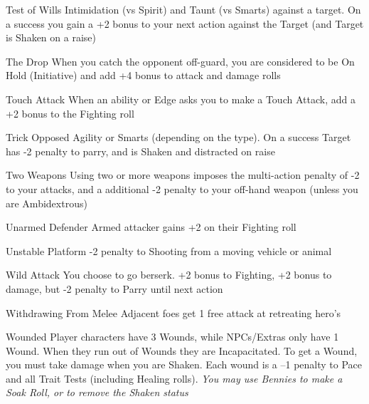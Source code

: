 \begin{genericsection}{Test of Wills}
Intimidation (vs Spirit) and Taunt (vs Smarts) against a target. On a success you gain a +2 bonus to your next action against the Target (and Target is Shaken on a raise)
\end{genericsection}

\begin{genericsection}{The Drop}
When you catch the opponent off-guard, you are considered to be On Hold (Initiative) and add +4 bonus to attack and damage rolls
\end{genericsection}

\begin{genericsection}{Touch Attack}
When an ability or Edge asks you to make a Touch Attack, add a +2 bonus to the Fighting roll
\end{genericsection}

\begin{genericsection}{Trick}
Opposed Agility or Smarts (depending on the type). On a success Target has -2 penalty to parry, and is Shaken and distracted on raise
\end{genericsection}

\begin{genericsection}{Two Weapons}
Using two or more weapons imposes the multi-action penalty of -2 to your attacks, and a additional -2 penalty to your off-hand weapon (unless you are Ambidextrous)
\end{genericsection}

\begin{genericsection}{Unarmed Defender}
Armed attacker gains +2 on their Fighting roll
\end{genericsection}

\begin{genericsection}{Unstable Platform}
-2 penalty to Shooting from a moving vehicle or animal
\end{genericsection}

\begin{genericsection}{Wild Attack}
You choose to go berserk. +2 bonus to Fighting, +2 bonus to damage, but -2 penalty to Parry until next action
\end{genericsection}

\begin{genericsection}{Withdrawing From Melee}
Adjacent foes get 1 free attack at retreating hero's
\end{genericsection}

\begin{genericsection}{Wounded}
Player characters have 3 Wounds, while NPCs/Extras only have 1 Wound. When they run out of Wounds they are Incapacitated. To get a Wound, you must take damage when you are Shaken. Each wound is a –1 penalty to Pace and all Trait Tests (including Healing rolls). \textit{You may use Bennies to make a Soak Roll, or to remove the Shaken status}
\end{genericsection}
